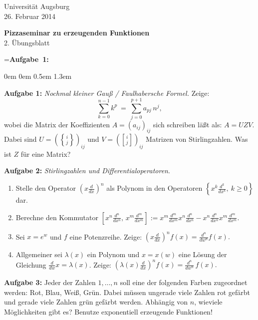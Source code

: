 \documentclass[a4paper,ngerman]{scrartcl}
\theoremstyle{definition}
\theoremstyle{plain}
\theoremstyle{remark}
\newcommand{\diff}[2]{\frac{d#2 }{d #1 #2}}
\begin{document}
\vspace*{-4em}
\begin{flushright}Universität Augsburg \\ 26. Februar 2014\end{flushright}

\begin{center}\Large \textbf{Pizzaseminar zu erzeugenden Funktionen} \\
2. Übungsblatt
\end{center}
\vspace{1.5em}

\newbox{\mybox}
\setbox\mybox=\hbox{\textbf{Aufgabe 1:}}

\begin{list}{}{0em \leftmargin0em \itemindent0.5em \itemsep 1.3em}
\item[\textbf{Aufgabe 1:}]
\emph{Nochmal kleiner Gauß / Faulhabersche Formel. } Zeige:
$$\sum_{k=0}^{n-1} k^p\ =\ \sum_{j=0}^{p+1} a_{pj}\, n^j,$$
wobei die Matrix der Koeffizienten $A = (a_{ij})_{ij}$ sich schreiben läßt als: $A = UZV$. Dabei sind $ U=\left(\genfrac\{\}{0pt}{}{i}{j}\right)_{ij} $ und $V=\left(\genfrac[]{0pt}{}{i}{j}\right)_{ij} $ Matrizen von Stirlingzahlen. Was ist $Z$ für eine Matrix?

\item[\textbf{Aufgabe 2:}] \emph{Stirlingzahlen und Differentialoperatoren}.
\begin{enumerate}
\item Stelle den Operator $\left(x\diff{x}{}\right)^n$ als Polynom in den Operatoren $\left\{x^k\diff{x}{^k},\ k\geq0\right\}$ dar.
\item Berechne den Kommutator $\left[x^n\diff{x}{^n},\,x^m\diff{x}{^m}\right] :=x^m\diff{x}{^m} x^n\diff{x}{^n} - x^n \diff{x}{^n}x^m\diff{x}{^m} $.
\item Sei $x=e^w$ und $f$ eine Potenzreihe. Zeige: $ \left(x\diff{x}{}\right)^n f(x)=
\diff{w}{^n}f(x).
$
\item Allgemeiner sei $\lambda(x)$ ein Polynom und $x = x(w)$ eine Lösung der Gleichung $\diff{w}{}x = \lambda(x)$.  Zeige:
$\left(\lambda(x)\diff{x}{}\right)^n f(x)= \diff{w}{^n}\,f(x). $
\end{enumerate} 

\item[\textbf{Aufgabe 3: }] Jeder der Zahlen $1,\ldots,n$ soll eine der folgenden Farben zugeordnet werden: Rot, Blau, Weiß, Grün. Dabei müssen ungerade viele Zahlen rot gefärbt und gerade viele Zahlen grün gefärbt werden. Abhängig von $n$, wieviele Möglichkeiten gibt es? Benutze exponentiell erzeugende Funktionen!


\end{list}
\end{document}
